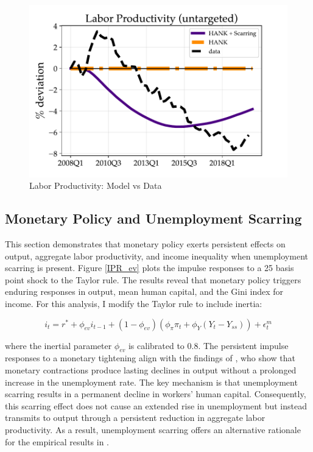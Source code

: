 \begin{figure}[!ht!]
\begin{center}
\includegraphics[scale=0.8]{text/chapter1/Figures/GR_sim/labor_productivity}
\end{center}
\caption{Labor Productivity: Model vs Data}
 \label{LP_GR}
\end{figure}


\subsection{Monetary Policy and Unemployment Scarring}
\label{appendix:MP}

This section demonstrates that monetary policy exerts persistent effects on output, aggregate labor productivity, and income inequality when unemployment scarring is present. Figure \ref{IPR_ev} plots the impulse responses to a 25 basis point shock to the Taylor rule. The results reveal that monetary policy triggers enduring responses in output, mean human capital, and the Gini index for income. For this analysis, I modify the Taylor rule to include inertia: 


$$i_{t} = r^{*} + \phi_{ev} i_{t-1} + (1-\phi_{ev})(\phi_{\pi} \pi_{t} + \phi_{Y} (Y_{t} - Y_{ss})) + \epsilon^{m}_{t}$$

where the inertial parameter $\phi_{ev}$ is calibrated to 0.8. The persistent impulse responses to a monetary tightening align with the findings of \cite{Jorda2023}, who show that monetary contractions produce lasting declines in output without a prolonged increase in the unemployment rate. The key mechanism is that unemployment scarring results in a permanent decline in workers' human capital. Consequently, this scarring effect does not cause an extended rise in unemployment but instead transmits to output through a persistent reduction in aggregate labor productivity. As a result, unemployment scarring offers an alternative rationale for the empirical results in \cite{Jorda2023}.





